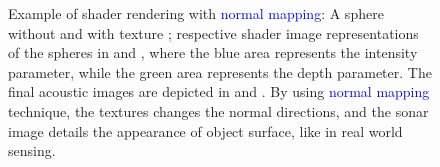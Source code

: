 \documentclass[final,5p,times]{elsarticle}
\begin{document}
\begin{figure}[t]
{        \label{fig:normal_5}
    }
    \captionsetup{justification=justified}
    \caption{Example of shader rendering with \textcolor{blue}{normal mapping}:
    A sphere without  and with texture
    ; respective shader image representations of the spheres
    in  and , where the blue area represents the
    intensity parameter, while the green area represents the depth parameter. The final acoustic
    images are depicted in  and . By using
    \textcolor{blue}{normal mapping} technique, the textures changes the normal directions,
    and the sonar image details the appearance of object surface, like
    in real world sensing.}
    \label{fig:sonar_normal_mapping}
\end{figure}
\end{document}
